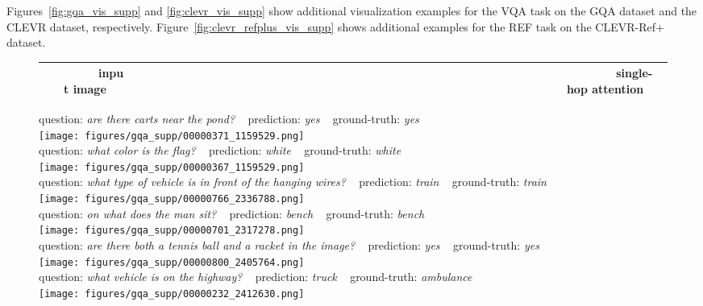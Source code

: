 \documentclass[10pt,twocolumn,letterpaper]{article}
\begin{document}
Figures~\ref{fig:gqa_vis_supp} and \ref{fig:clevr_vis_supp} show additional visualization examples for the VQA task on the GQA dataset and the CLEVR dataset, respectively. Figure~\ref{fig:clevr_refplus_vis_supp} shows additional examples for the REF task on the CLEVR-Ref+ dataset.

\begin{figure*}[t]
\centering
\small
\begin{tabularx}{\linewidth}{*{6}{c}}
~~~~~~~~input image & ~~~~~~~~~~~~~~~~~ & ~~~~~~~~~~~~~~~~~~~~~~~ & ~~~~~~~~~~~~~~~~~~~~~~ & ~~~~~~~~~~~~~~~~~~~~~~~ & ~~~~~~~~~single-hop attention  \\
\hline
\end{tabularx}

\vspace{1mm}

question: \textit{are there carts near the pond?} ~ prediction: \textit{yes} ~ ground-truth: \textit{yes} \\
\texttt{[image: figures/gqa\_supp/00000371\_1159529.png]} \\

question: \textit{what color is the flag?} ~ prediction: \textit{white} ~ ground-truth: \textit{white} \\
\texttt{[image: figures/gqa\_supp/00000367\_1159529.png]} \\

question: \textit{what type of vehicle is in front of the hanging wires?} ~ prediction: \textit{train} ~ ground-truth: \textit{train} \\
\texttt{[image: figures/gqa\_supp/00000766\_2336788.png]} \\

question: \textit{on what does the man sit?} ~ prediction: \textit{bench} ~ ground-truth: \textit{bench} \\
\texttt{[image: figures/gqa\_supp/00000701\_2317278.png]} \\

question: \textit{are there both a tennis ball and a racket in the image?} ~ prediction: \textit{yes} ~ ground-truth: \textit{yes} \\
\texttt{[image: figures/gqa\_supp/00000800\_2405764.png]} \\

question: \textit{what vehicle is on the highway?} ~ prediction: \textit{truck} ~ ground-truth: \textit{ambulance} \\
\texttt{[image: figures/gqa\_supp/00000232\_2412630.png]} \\


\end{figure*}
\end{document}
